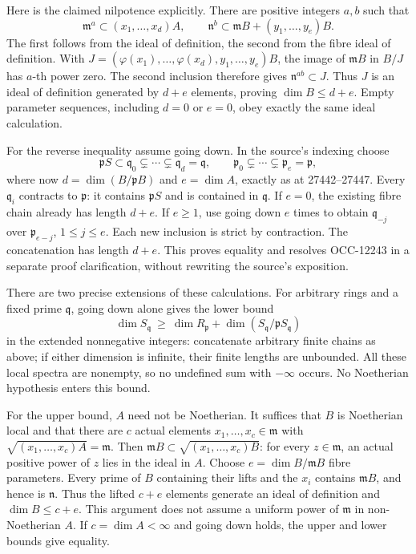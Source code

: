 Here is the claimed nilpotence explicitly. There are positive integers \(a,b\) such that \[
 \mathfrak m^a\subset(x_1,\ldots,x_d)A,\qquad
 \mathfrak n^b\subset\mathfrak mB+(y_1,\ldots,y_e)B.
\] The first follows from the ideal of definition, the second from the fibre ideal of definition. With \(J=(\varphi(x_1),\ldots,\varphi(x_d),
y_1,\ldots,y_e)B\), the image of \(\mathfrak mB\) in \(B/J\) has \(a\)-th power zero. The second inclusion therefore gives \(\mathfrak n^{ab}\subset J\). Thus \(J\) is an ideal of definition generated by \(d+e\) elements, proving \(\dim B\leq d+e\). Empty parameter sequences, including \(d=0\) or \(e=0\), obey exactly the same ideal calculation.

For the reverse inequality assume going down. In the source's indexing choose \[
 \mathfrak pS\subset\mathfrak q_0\subsetneq\cdots
 \subsetneq\mathfrak q_d=\mathfrak q,\qquad
 \mathfrak p_0\subsetneq\cdots\subsetneq\mathfrak p_e=\mathfrak p,
\] where now \(d=\dim(B/\mathfrak pB)\) and \(e=\dim A\), exactly as at 27442--27447. Every \(\mathfrak q_i\) contracts to \(\mathfrak p\): it contains \(\mathfrak pS\) and is contained in \(\mathfrak q\). If \(e=0\), the existing fibre chain already has length \(d+e\). If \(e\geq1\), use going down \(e\) times to obtain \(\mathfrak q_{-j}\) over \(\mathfrak p_{e-j}\), \(1\leq j\leq e\). Each new inclusion is strict by contraction. The concatenation has length \(d+e\). This proves equality and resolves OCC-12243 in a separate proof clarification, without rewriting the source's exposition.

There are two precise extensions of these calculations. For arbitrary rings and a fixed prime \(\mathfrak q\), going down alone gives the lower bound \[
 \dim S_{\mathfrak q}\ \geq\
 \dim R_{\mathfrak p}+\dim(S_{\mathfrak q}/\mathfrak pS_{\mathfrak q})
\] in the extended nonnegative integers: concatenate arbitrary finite chains as above; if either dimension is infinite, their finite lengths are unbounded. All these local spectra are nonempty, so no undefined sum with \(-\infty\) occurs. No Noetherian hypothesis enters this bound.

For the upper bound, \(A\) need not be Noetherian. It suffices that \(B\) is Noetherian local and that there are \(c\) actual elements \(x_1,\ldots,x_c\in\mathfrak m\) with \(\sqrt{(x_1,\ldots,x_c)A}=\mathfrak m\). Then \(\mathfrak mB\subset\sqrt{(x_1,\ldots,x_c)B}\): for every \(z\in
\mathfrak m\), an actual positive power of \(z\) lies in the ideal in \(A\). Choose \(e=\dim B/\mathfrak mB\) fibre parameters. Every prime of \(B\) containing their lifts and the \(x_i\) contains \(\mathfrak mB\), and hence is \(\mathfrak n\). Thus the lifted \(c+e\) elements generate an ideal of definition and \(\dim B\leq c+e\). This argument does not assume a uniform power of \(\mathfrak m\) in non-Noetherian \(A\). If \(c=\dim A<\infty\) and going down holds, the upper and lower bounds give equality.

